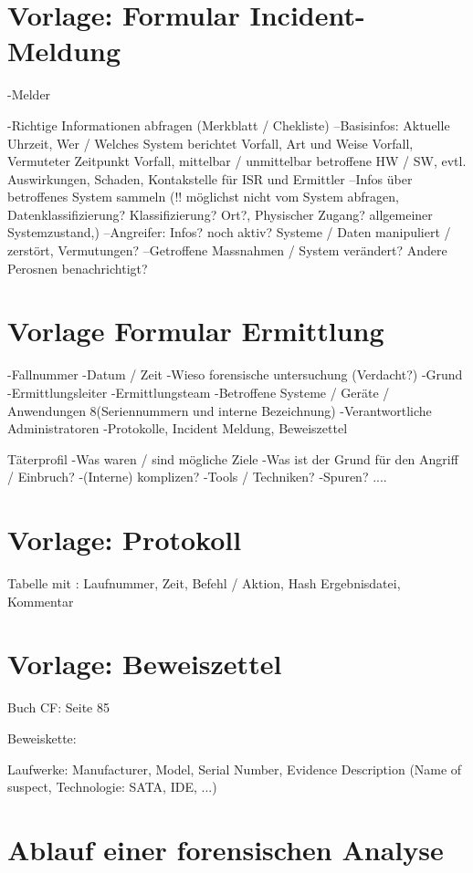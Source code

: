 
%



\chapter{Vorlage: Formular Incident-Meldung} \label{appx:Template:IncidentMessage}
-Melder

-Richtige Informationen abfragen (Merkblatt / Chekliste)
--Basisinfos: Aktuelle Uhrzeit, Wer / Welches System berichtet Vorfall, Art und Weise Vorfall, Vermuteter Zeitpunkt Vorfall, mittelbar / unmittelbar betroffene HW / SW, evtl. Auswirkungen, Schaden, Kontakstelle für ISR und Ermittler
--Infos über betroffenes System sammeln (!! möglichst nicht vom System abfragen, Datenklassifizierung? Klassifizierung? Ort?, Physischer Zugang?  allgemeiner Systemzustand,)
--Angreifer: Infos? noch aktiv? Systeme / Daten manipuliert / zerstört, Vermutungen?
--Getroffene Massnahmen / System verändert? Andere Perosnen benachrichtigt?

\chapter{Vorlage Formular Ermittlung}
-Fallnummer
-Datum / Zeit
-Wieso forensische untersuchung (Verdacht?)
-Grund
-Ermittlungsleiter
-Ermittlungsteam
-Betroffene Systeme / Geräte / Anwendungen 8(Seriennummern und interne Bezeichnung)
-Verantwortliche Administratoren
-Protokolle, Incident Meldung, Beweiszettel

Täterprofil
-Was waren / sind mögliche Ziele
-Was ist der Grund für den Angriff / Einbruch?
-(Interne) komplizen?
-Tools / Techniken?
-Spuren?
....
\chapter{Vorlage: Protokoll}


Tabelle mit : Laufnummer, Zeit, Befehl / Aktion, Hash Ergebnisdatei, Kommentar


\chapter{Vorlage: Beweiszettel} \label{appx:Template:ProofPaper}
Buch CF: Seite 85

Beweiskette:

Laufwerke: Manufacturer, Model, Serial Number, Evidence Description (Name of suspect, Technologie: SATA, IDE, ...)





\chapter{Ablauf einer forensischen Analyse}

